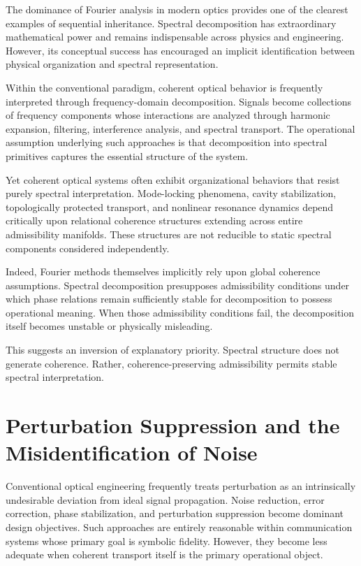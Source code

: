 \documentclass[11pt,openany]{book}
\theoremstyle{definition}
\theoremstyle{plain}
\begin{document}
The dominance of Fourier analysis in modern optics provides one of the clearest examples of sequential inheritance. Spectral decomposition has extraordinary mathematical power and remains indispensable across physics and engineering. However, its conceptual success has encouraged an implicit identification between physical organization and spectral representation.

Within the conventional paradigm, coherent optical behavior is frequently interpreted through frequency-domain decomposition. Signals become collections of frequency components whose interactions are analyzed through harmonic expansion, filtering, interference analysis, and spectral transport. The operational assumption underlying such approaches is that decomposition into spectral primitives captures the essential structure of the system.

Yet coherent optical systems often exhibit organizational behaviors that resist purely spectral interpretation. Mode-locking phenomena, cavity stabilization, topologically protected transport, and nonlinear resonance dynamics depend critically upon relational coherence structures extending across entire admissibility manifolds. These structures are not reducible to static spectral components considered independently.

Indeed, Fourier methods themselves implicitly rely upon global coherence assumptions. Spectral decomposition presupposes admissibility conditions under which phase relations remain sufficiently stable for decomposition to possess operational meaning. When those admissibility conditions fail, the decomposition itself becomes unstable or physically misleading.

This suggests an inversion of explanatory priority. Spectral structure does not generate coherence. Rather, coherence-preserving admissibility permits stable spectral interpretation.

\section{Perturbation Suppression and the Misidentification of Noise}

Conventional optical engineering frequently treats perturbation as an intrinsically undesirable deviation from ideal signal propagation. Noise reduction, error correction, phase stabilization, and perturbation suppression become dominant design objectives. Such approaches are entirely reasonable within communication systems whose primary goal is symbolic fidelity. However, they become less adequate when coherent transport itself is the primary operational object.
\end{document}
